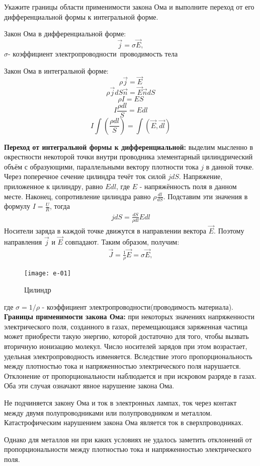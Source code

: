 \documentclass[__main__.tex]{subfiles}
\begin{document}
Укажите границы области применимости закона Ома и выполните переход от его дифференциальной формы к интегральной форме.\\

\begin{definition}
    Закон Ома в дифференциальной форме:
    $$\vec{j}=σ\vec{E},$$
    $σ$- коэффициент электропроводности\ проводимость тела
\end{definition}
\begin{definition}
    Закон Ома в интегральной форме:
    $$ρ\vec{j}=\vec{E}$$
    $$ρ\vec{j}dS\vec{n}=\vec{E}\vec{n}dS$$
    $$ρI=ES$$
    $$I\frac{ρdl}{S}=Edl$$
    $$I\int(\frac{ρdl}{S})=\int(\vec{E},\vec{dl})$$
\end{definition}
\textbf{Переход от интегральной формы к дифференциальной:} выделим мысленно в окрестности некоторой точки внутри проводника элементарный цилиндрический объём с образующими, параллельными вектору плотности тока $j$ в данной  точке. Через поперечное сечение цилиндра течёт ток силой $jdS$. Напряжение, приложенное к цилиндру, равно $Edl$, где $E$ - напряжённость поля в данном месте. Наконец, сопротивление цилиндра равно $\rho\frac{dl}{dS}$. Подставим эти значения в формулу $I = \frac{U}{R}$, тогда
\begin{gather*}
    jdS = \frac{dS}{\rho dl}Edl
\end{gather*}
Носители заряда в каждой точке движутся в направлении вектора $\vec{E}$. Поэтому направления $\vec{j}$ и $\vec{E}$ совпадают. Таким образом, получим:
\begin{gather*}
    \vec{J} = \frac{1}{\rho}\vec{E} = \sigma \vec{E},
\end{gather*}
\begin{wrapfigure}{L}{.3\linewidth}
    \texttt{[image: e-01]}
    \caption{Цилиндр}
\end{wrapfigure}
где $\sigma = 1/\rho$ - коэффициент электропроводности(проводимость материала).\\

\textbf{Границы применимости закона Ома:} при некоторых значениях напряженности электрического поля, созданного в газах, перемещающаяся заряженная частица может приобрести такую энергию, которой достаточно для того, чтобы вызвать вторичную ионизацию молекул. Число носителей зарядов при этом возрастает, удельная электропроводность изменяется. Вследствие этого пропорциональность между плотностью тока и напряженностью электрического поля нарушается. Отклонение от пропорциональности наблюдается и при искровом разряде в газах. Оба эти случая означают явное нарушение закона Ома.

Не подчиняется закону Ома и ток в электронных лампах, ток через контакт между двумя полупроводниками или полупроводником и металлом. Катастрофическим нарушением закона Ома является ток в сверхпроводниках.

Однако для металлов ни при каких условиях не удалось заметить отклонений от пропорциональности между плотностью тока и напряженностью электрического поля.
\end{document}
